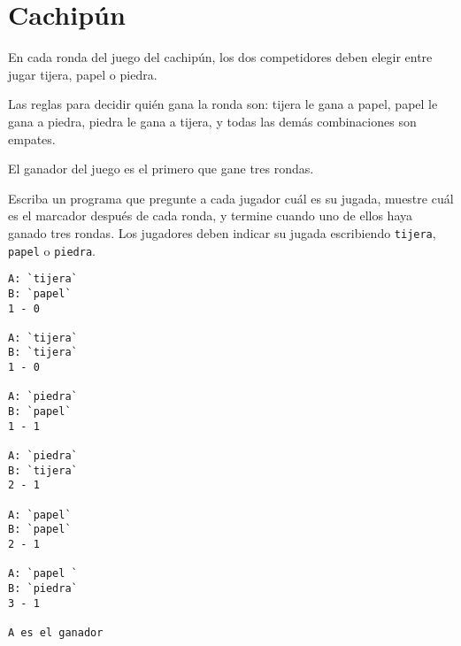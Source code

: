 \section{Cachipún}

En cada ronda del juego del cachipún, los dos competidores deben elegir
entre jugar tijera, papel o piedra.

Las reglas para decidir quién gana la ronda son: tijera le gana a papel,
papel le gana a piedra, piedra le gana a tijera, y todas las demás
combinaciones son empates.

El ganador del juego es el primero que gane tres rondas.

Escriba un programa que pregunte a cada jugador cuál es su jugada,
muestre cuál es el marcador después de cada ronda, y termine cuando uno
de ellos haya ganado tres rondas. Los jugadores deben indicar su jugada
escri\-biendo \lstinline!tijera!, \lstinline!papel! o \lstinline!piedra!.

\begin{lstlisting}[language=testcase]
A: `tijera`
B: `papel`
1 - 0

A: `tijera`
B: `tijera`
1 - 0

A: `piedra`
B: `papel`
1 - 1

A: `piedra`
B: `tijera`
2 - 1

A: `papel`
B: `papel`
2 - 1

A: `papel `
B: `piedra`
3 - 1

A es el ganador
\end{lstlisting}
